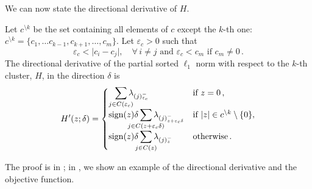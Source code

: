 
We can now state the directional derivative of $H$. %

\begin{theorem}\label{thm:sl1-directional-derivative}
  Let \(c^{\setminus k}\) be the set containing all elements of $c$ except the $k$-th one: $c^{\setminus k} =  \{c_1, \ldots c_{k-1}, c_{k+1}, \ldots, c_m \}$.
  Let $\varepsilon_c > 0$ such that
  \begin{equation}
    \label{eq:epsilon-c}
    \varepsilon_c < \big| c_i - c_j\big| , \quad \forall\, i \neq j \text{ and } \varepsilon_c < c_m \text{ if } c_m \neq 0 \, .
  \end{equation}
  The directional derivative of the partial sorted $\ell_1$ norm with respect to the $k$-th cluster, \(H\), in the direction \(\delta\) is
  \[
    H'(z; \delta) =
    \begin{cases}
      \smashoperator[r]{\sum_{j \in C(\varepsilon_c )}} \lambda_{(j)^-_{\varepsilon_c }}
       & \text{if } z = 0 \, ,                                \\
      \sign(z)\delta\smashoperator{\sum_{j \in C(z + {\varepsilon_c} \delta)}} \lambda_{(j)^-_{z + {\varepsilon_c}\delta}}
       & \text{if } |z| \in c^{\setminus k} \setminus \{0\} , \\
      \sign(z)\delta\smashoperator{\sum_{j \in C(z)}} \lambda_{(j)^-_{z}}
       & \text{otherwise} \, .
    \end{cases}
  \]
\end{theorem}
The proof is in ; in , we show an example of the directional
derivative and the objective function.


